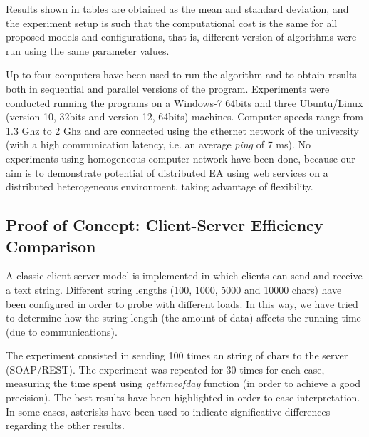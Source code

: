 \documentclass[final,1p,times]{elsarticle}
\begin{document}
Results shown in tables are obtained as the mean and standard deviation, and the experiment setup is such that the computational cost is the same for all proposed models and configurations, that is, different version of algorithms were run using the same parameter values.


Up to four computers have been used to run the algorithm and to obtain results both in sequential and parallel versions of the program. 
Experiments were conducted running the programs on a Windows-7 64bits and three Ubuntu/Linux (version 10, 32bits and version 12, 64bits) machines.
Computer speeds range from 1.3 Ghz to 2 Ghz and are connected using the ethernet network of the university (with a high communication latency, i.e. an average \emph{ping} of 7 ms). 
No experiments using homogeneous computer network have been done, because our aim is to demonstrate potential of distributed EA using web services on a distributed heterogeneous environment, taking advantage of flexibility. %


\subsection{Proof of Concept: Client-Server Efficiency Comparison}
\label{subsect:experiment1}


A classic client-server model is implemented in which clients can send and receive a text string.
Different string lengths (100, 1000, 5000 and 10000 chars) have been configured in order to probe with different loads. In this way, we have tried to determine how the string length (the amount of data) affects the running time (due to communications).

The experiment consisted in sending 100 times an string of chars to the server (SOAP/REST). The experiment was repeated for 30 times for each case, measuring the time spent using \emph{gettimeofday} function (in order to achieve a good precision).
The best results have been highlighted in order to ease interpretation. In some cases, asterisks have been used to indicate significative differences regarding the other results.

\end{document}
